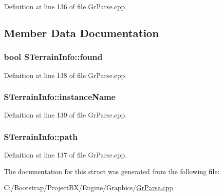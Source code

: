 Definition at line 136 of file GrParse.cpp.

\subsection{Member Data Documentation}
\hypertarget{struct_s_terrain_info_02668db2830c7bb2d6afe5875ea182e9}{
\subsubsection[{found}]{\setlength{\rightskip}{0pt plus 5cm}bool {\bf STerrainInfo::found}}}
\label{struct_s_terrain_info_02668db2830c7bb2d6afe5875ea182e9}




Definition at line 138 of file GrParse.cpp.\hypertarget{struct_s_terrain_info_a372741e19a5bb43394c1fe36e0c55f8}{
\subsubsection[{instanceName}]{ {\bf STerrainInfo::instanceName}}}
\label{struct_s_terrain_info_a372741e19a5bb43394c1fe36e0c55f8}




Definition at line 139 of file GrParse.cpp.\hypertarget{struct_s_terrain_info_9486e3c92a348c875916be85672b06f2}{
\subsubsection[{path}]{ {\bf STerrainInfo::path}}}
\label{struct_s_terrain_info_9486e3c92a348c875916be85672b06f2}




Definition at line 137 of file GrParse.cpp.

The documentation for this struct was generated from the following file:\begin{CompactItemize}
\item 
C:/Bootstrap/ProjectBX/Engine/Graphics/\hyperlink{_gr_parse_8cpp}{GrParse.cpp}\end{CompactItemize}

